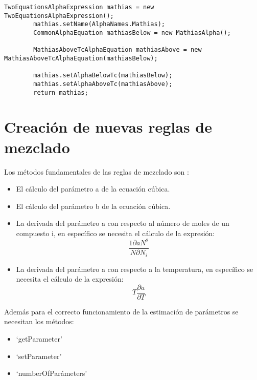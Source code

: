 	\begin{lstlisting}[caption={Creación de una expresión de $\alpha$ con cambio de ecuación según la temperatura del sistema},label={lst:twoAlphaExample}]
		TwoEquationsAlphaExpression mathias = new TwoEquationsAlphaExpression();    
        mathias.setName(AlphaNames.Mathias);
        CommonAlphaEquation mathiasBelow = new MathiasAlpha();
        
        MathiasAboveTcAlphaEquation mathiasAbove = new MathiasAboveTcAlphaEquation(mathiasBelow);
        
        mathias.setAlphaBelowTc(mathiasBelow);
        mathias.setAlphaAboveTc(mathiasAbove);
        return mathias;     
	\end{lstlisting}

\section{Creación de nuevas reglas de mezclado}\label{sec:newMixingRules}
	
	Los métodos fundamentales de las reglas de mezclado son :

	\begin{itemize}
		\item El cálculo del parámetro a de la ecuación cúbica.
		\item El cálculo del parámetro b de la ecuación cúbica.
		\item La derivada del parámetro a con respecto al número de moles de un compuesto i, en específico se necesita el cálculo de la expresión: 
		\begin{equation}
			\frac{1\partial a N^2}{N \partial N_i}
		\end{equation}
		\item La derivada del parámetro a con respecto a la temperatura, en específico se necesita el cálculo de la expresión: 
		\begin{equation}
			T \frac{\partial a}{\partial T}
		\end{equation}
	\end{itemize}

	Además para el correcto funcionamiento de la estimación de parámetros se necesitan los métodos: 
	\begin{itemize}
		\item `getParameter'
		\item `setParameter'
		\item `numberOfParámeters'
	\end{itemize}

